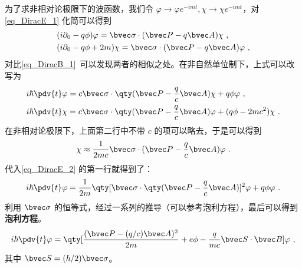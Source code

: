 为了求非相对论极限下的波函数，我们令 $\varphi\rightarrow \varphi e^{-imt},\chi\rightarrow \chi e^{-imt}$，对 \autoref{eq_DiracE_1} 化简可以得到
\begin{equation}\label{eq_DiracE_5}
\begin{aligned}
&(i\partial_0 - q \phi)\varphi = \bvec \sigma\cdot (\bvec P-q\bvec A) \chi~,\\
&(i\partial_0 - q \phi + 2m) \chi = \bvec \sigma\cdot (\bvec P-q\bvec A)  \varphi~,
\end{aligned}
\end{equation}
对比\autoref{eq_DiracB_1}~可以发现两者的相似之处。在非自然单位制下，上式可以改写为
\begin{equation}\label{eq_DiracE_2}
\begin{aligned}
&i\hbar \pdv{t} \varphi = c\bvec \sigma\cdot \qty(\bvec P-\frac{q}{c}\bvec A)\chi + q \phi \varphi~,\\
&i\hbar\pdv{t} \chi = c \bvec \sigma\cdot \qty(\bvec P-\frac{q}{c}\bvec A) \varphi + (q \phi-2mc^2) \chi~.
\end{aligned}
\end{equation}
在非相对论极限下，上面第二行中不带 $c$ 的项可以略去，于是可以得到
\begin{equation}
\chi\approx \frac{1}{2mc} \bvec \sigma \cdot(\bvec P-\frac{q}{c}\bvec A)\varphi~.
\end{equation}
代入\autoref{eq_DiracE_2} 的第一行就得到了：
\begin{equation}
i\hbar\pdv{t} \varphi = \frac{1}{2m}\qty[\bvec \sigma \cdot\qty(\bvec P - \frac{q}{c}\bvec A)]^2 \varphi + q\phi  \varphi~.
\end{equation}
利用 $\bvec \sigma$ 的恒等式，经过一系列的推导（可以参考泡利方程），最后可以得到\textbf{泡利方程}。
\begin{equation}
i\hbar\pdv{t} \varphi = \qty[\frac{(\bvec P - (q/c)\bvec A)^2}{2m}+e\phi-\frac{q}{mc}\bvec S\cdot \bvec B]\varphi~,
\end{equation}
其中 $\bvec S=(\hbar/2)\bvec \sigma$。
